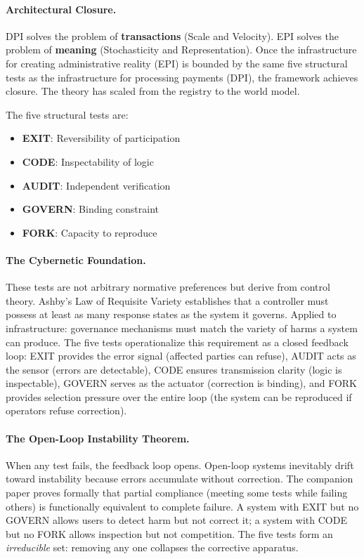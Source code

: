 \documentclass[11pt,a4paper]{article}
\theoremstyle{definition}
\begin{document}
\paragraph{Architectural Closure.} DPI solves the problem of \textbf{transactions} (Scale and Velocity). EPI solves the problem of \textbf{meaning} (Stochasticity and Representation). Once the infrastructure for creating administrative reality (EPI) is bounded by the same five structural tests as the infrastructure for processing payments (DPI), the framework achieves closure. The theory has scaled from the registry to the world model.

The five structural tests are:

\begin{itemize}[noitemsep]
    \item \textbf{EXIT}: Reversibility of participation
    \item \textbf{CODE}: Inspectability of logic
    \item \textbf{AUDIT}: Independent verification
    \item \textbf{GOVERN}: Binding constraint
    \item \textbf{FORK}: Capacity to reproduce
\end{itemize}

\paragraph{The Cybernetic Foundation.} These tests are not arbitrary normative preferences but derive from control theory. Ashby's Law of Requisite Variety \citep{ashby1956} establishes that a controller must possess at least as many response states as the system it governs. Applied to infrastructure: governance mechanisms must match the variety of harms a system can produce. The five tests operationalize this requirement as a closed feedback loop: EXIT provides the error signal (affected parties can refuse), AUDIT acts as the sensor (errors are detectable), CODE ensures transmission clarity (logic is inspectable), GOVERN serves as the actuator (correction is binding), and FORK provides selection pressure over the entire loop (the system can be reproduced if operators refuse correction).

\paragraph{The Open-Loop Instability Theorem.} When any test fails, the feedback loop opens. Open-loop systems inevitably drift toward instability because errors accumulate without correction. The companion paper proves formally that partial compliance (meeting some tests while failing others) is functionally equivalent to complete failure. A system with EXIT but no GOVERN allows users to detect harm but not correct it; a system with CODE but no FORK allows inspection but not competition. The five tests form an \textit{irreducible} set: removing any one collapses the corrective apparatus.
\end{document}
